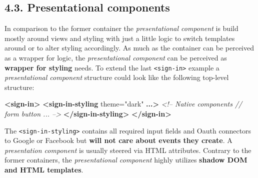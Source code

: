 \documentclass[]{article}
\newenvironment{Shaded}{}{}
\newcommand{\KeywordTok}[1]{\textcolor[rgb]{0.00,0.44,0.13}{\textbf{{#1}}}}
\newcommand{\StringTok}[1]{\textcolor[rgb]{0.25,0.44,0.63}{{#1}}}
\newcommand{\CommentTok}[1]{\textcolor[rgb]{0.38,0.63,0.69}{\textit{{#1}}}}
\newcommand{\OtherTok}[1]{\textcolor[rgb]{0.00,0.44,0.13}{{#1}}}
\newcommand{\ErrorTok}[1]{\textcolor[rgb]{1.00,0.00,0.00}{\textbf{{#1}}}}
\begin{document}
\subsection{4.3. Presentational
components}\label{presentational-components}

In comparison to the former container the \emph{presentational
component} is build mostly around views and styling with just a little
logic to switch templates around or to alter styling accordingly. As
much as the container can be perceived as a wrapper for logic, the
\emph{presentational component} can be perceived as \textbf{wrapper for
styling} needs. To extend the last
\texttt{\textless{}sign-in\textgreater{}} example a \emph{presentational
component} structure could look like the following top-level structure:

\begin{Shaded}
\begin{Highlighting}[]
\KeywordTok{<sign-in>}
  \KeywordTok{<sign-in-styling}\OtherTok{ theme=}\StringTok{"dark"} \ErrorTok{...}\KeywordTok{>}
    \CommentTok{<!-- Native components // form button ... -->}
  \KeywordTok{</sign-in-styling>}
\KeywordTok{</sign-in>}
\end{Highlighting}
\end{Shaded}

The \texttt{\textless{}sign-in-styling\textgreater{}} contains all
required input fields and Oauth connectors to Google or Facebook but
\textbf{will not care about events they create}. A \emph{presentation
component} is usually steered via HTML attributes. Contrary to the
former containers, the \emph{presentational component} highly utilizes
\textbf{shadow DOM and HTML templates}.
\end{document}
